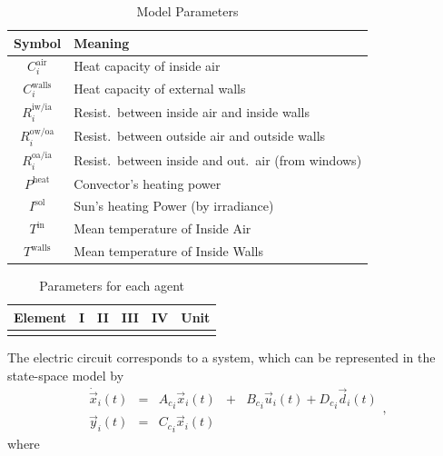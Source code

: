 \documentclass[../main.tex]{subfiles}
\begin{document}
\begin{table}[h]
  \centering
  \caption{Model Parameters}\label{tab:modelParamMeaning}
  \begin{tabular}[b]{cl}
    \toprule
    Symbol&Meaning\\
    \midrule
    $C^{\text{air}}_{i}$  &Heat capacity of inside air\\
    $C^{\text{walls}}_{i}$ &Heat capacity of external walls\\
    $R^{\text{iw/ia}}_{i}$ &Resist.\ between inside air and inside walls\\
    $R^{\text{ow/oa}}_{i}$ &Resist.\ between outside air and outside walls\\
    $R^{\text{oa/ia}}_{i}$ &Resist.\ between inside and out.\ air (from windows)\\
    $P^{\text{heat}}$ &Convector's heating power\\
    $I^{\text{sol}}$ &Sun's heating Power (by irradiance)\\
    $T^{\text{in}}$ &Mean temperature of Inside Air\\
    $T^{\text{walls}}$ &Mean temperature of Inside Walls\\
    \bottomrule
  \end{tabular}
\end{table}

\begin{table}[h]
  \centering
  \caption{
    Parameters for each agent}\label{tab:modelParam}
  \begin{tabular}[t]{cccccc} \toprule
    Element& I & II & III & IV &Unit\\
    \midrule
    \\
    \bottomrule
  \end{tabular}
\end{table}


The electric circuit corresponds to a \ltict{} system, which can be represented in the state-space model by
  \begin{equation}
  \begin{matrix}
    \label{eq:systems_cont}
    \dot{\vec{x}}_{i}(t)  &=&{A_{c}}_{i}\vec{x}_{i}(t) &+& {B_{c}}_{i}\vec{u}_{i}(t)+{D_{c}}_{i}\vec{d}_{i}(t)\\
    \vec{y}_{i}(t)        &=&{C_{c}}_{i}\vec{x}_{i}(t) &&
  \end{matrix},
\end{equation}
where
\end{document}
